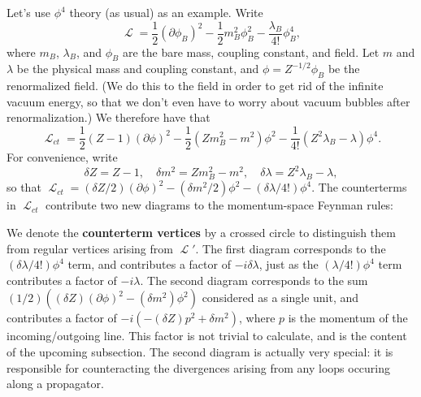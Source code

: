 \documentclass{report}
\theoremstyle{plain}
\theoremstyle{definition}
\theoremstyle{remark}
\DeclareMathOperator{\cL}{\mathcal{L}}
\begin{document}
Let's use $\phi^4$ theory (as usual) as an example. Write
$$ \cL = \frac{1}{2} (\partial \phi_B)^2 - \frac{1}{2} m_B^2 \phi_B^2 - \frac{\lambda_B}{4!} \phi_B^4, $$
where $m_B$, $\lambda_B$, and $\phi_B$ are the bare mass, coupling
constant, and field. Let $m$ and $\lambda$ be the physical mass and
coupling constant, and $\phi = Z^{-1/2}\phi_B$ be the renormalized
field. (We do this to the field in order to get rid of the infinite
vacuum energy, so that we don't even have to worry about vacuum
bubbles after renormalization.) We therefore have that
$$ \cL_{ct} = \frac{1}{2} (Z-1) (\partial\phi)^2 - \frac{1}{2}(Zm_B^2 - m^2) \phi^2 - \frac{1}{4!} (Z^2 \lambda_B - \lambda) \phi^4. $$
For convenience, write
$$ \delta Z = Z - 1, \quad \delta m^2 = Zm_B^2 - m^2, \quad \delta \lambda = Z^2 \lambda_B - \lambda, $$
so that
$\cL_{ct} = (\delta Z/2)(\partial\phi)^2 - (\delta m^2/2) \phi^2 -
(\delta\lambda/4!)\phi^4$.
The counterterms in $\cL_{ct}$ contribute two new diagrams to the
momentum-space Feynman rules:
\begin{center}
  \begin{minipage}{0.3\textwidth}
    \centering
  \end{minipage}
  \begin{minipage}{0.3\textwidth}
    \centering
  \end{minipage}
\end{center}
We denote the {\bf counterterm vertices} by a crossed circle to
distinguish them from regular vertices arising from $\cL'$. The first
diagram corresponds to the $(\delta\lambda/4!)\phi^4$ term, and
contributes a factor of $-i\delta\lambda$, just as the
$(\lambda/4!)\phi^4$ term contributes a factor of $-i\lambda$. The
second diagram corresponds to the sum
$(1/2)((\delta Z)(\partial\phi)^2 - (\delta m^2)\phi^2)$ considered
as a single unit, and contributes a factor of
$-i(-(\delta Z)p^2 + \delta m^2)$, where $p$ is the momentum of the
incoming/outgoing line. This factor is not trivial to calculate, and
is the content of the upcoming subsection. The second diagram is
actually very special: it is responsible for counteracting the
divergences arising from any loops occuring along a propagator.
\end{document}
